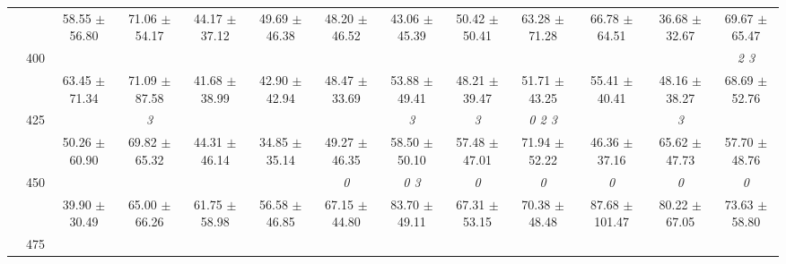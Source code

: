 \begin{table}[h]
{\begin{tabular}{
        ccccccccccccc}
 & & \cellcolor[HTML]{EFEFEF} 58.55 $\pm$ 56.80& \cellcolor[HTML]{EFEFEF} 71.06 $\pm$ 54.17& \cellcolor[HTML]{EFEFEF} 44.17 $\pm$ 37.12& \cellcolor[HTML]{EFEFEF} 49.69 $\pm$ 46.38& \cellcolor[HTML]{EFEFEF} 48.20 $\pm$ 46.52& \cellcolor[HTML]{EFEFEF} 43.06 $\pm$ 45.39& \cellcolor[HTML]{EFEFEF} 50.42 $\pm$ 50.41& \cellcolor[HTML]{EFEFEF} 63.28 $\pm$ 71.28& \cellcolor[HTML]{EFEFEF} 66.78 $\pm$ 64.51& \cellcolor[HTML]{EFEFEF} 36.68 $\pm$ 32.67& \cellcolor[HTML]{EFEFEF} 69.67 $\pm$ 65.47 \\ 
 & \multirow{2}{*}{400}& & & & & & & & & & & \textit{ 2 3 } \\ 
 & & 63.45 $\pm$ 71.34& 71.09 $\pm$ 87.58& 41.68 $\pm$ 38.99& 42.90 $\pm$ 42.94& 48.47 $\pm$ 33.69& 53.88 $\pm$ 49.41& 48.21 $\pm$ 39.47& 51.71 $\pm$ 43.25& 55.41 $\pm$ 40.41& 48.16 $\pm$ 38.27& 68.69 $\pm$ 52.76 \\ 
 & \multirow{2}{*}{425}& \cellcolor[HTML]{EFEFEF} & \cellcolor[HTML]{EFEFEF} \textit{ 3 }& \cellcolor[HTML]{EFEFEF} & \cellcolor[HTML]{EFEFEF} & \cellcolor[HTML]{EFEFEF} & \cellcolor[HTML]{EFEFEF} \textit{ 3 }& \cellcolor[HTML]{EFEFEF} \textit{ 3 }& \cellcolor[HTML]{EFEFEF} \textit{ 0 2 3 }& \cellcolor[HTML]{EFEFEF} & \cellcolor[HTML]{EFEFEF} \textit{ 3 }& \cellcolor[HTML]{EFEFEF}  \\ 
 & & \cellcolor[HTML]{EFEFEF} 50.26 $\pm$ 60.90& \cellcolor[HTML]{EFEFEF} 69.82 $\pm$ 65.32& \cellcolor[HTML]{EFEFEF} 44.31 $\pm$ 46.14& \cellcolor[HTML]{EFEFEF} 34.85 $\pm$ 35.14& \cellcolor[HTML]{EFEFEF} 49.27 $\pm$ 46.35& \cellcolor[HTML]{EFEFEF} 58.50 $\pm$ 50.10& \cellcolor[HTML]{EFEFEF} 57.48 $\pm$ 47.01& \cellcolor[HTML]{EFEFEF} 71.94 $\pm$ 52.22& \cellcolor[HTML]{EFEFEF} 46.36 $\pm$ 37.16& \cellcolor[HTML]{EFEFEF} 65.62 $\pm$ 47.73& \cellcolor[HTML]{EFEFEF} 57.70 $\pm$ 48.76 \\ 
 & \multirow{2}{*}{450}& & & & & \textit{ 0 }& \textit{ 0 3 }& \textit{ 0 }& \textit{ 0 }& \textit{ 0 }& \textit{ 0 }& \textit{ 0 } \\ 
 & & 39.90 $\pm$ 30.49& 65.00 $\pm$ 66.26& 61.75 $\pm$ 58.98& 56.58 $\pm$ 46.85& 67.15 $\pm$ 44.80& 83.70 $\pm$ 49.11& 67.31 $\pm$ 53.15& 70.38 $\pm$ 48.48& 87.68 $\pm$ 101.47& 80.22 $\pm$ 67.05& 73.63 $\pm$ 58.80 \\ 
 & \multirow{2}{*}{475}& \cellcolor[HTML]{EFEFEF} & \cellcolor[HTML]{EFEFEF} & \cellcolor[HTML]{EFEFEF} & \cellcolor[HTML]{EFEFEF} & \cellcolor[HTML]{EFEFEF} & \cellcolor[HTML]{EFEFEF} & \cellcolor[HTML]{EFEFEF} & \cellcolor[HTML]{EFEFEF} & \cellcolor[HTML]{EFEFEF} & \cellcolor[HTML]{EFEFEF} & \cellcolor[HTML]{EFEFEF}  \\ 

\end{tabular}}
\end{table}
